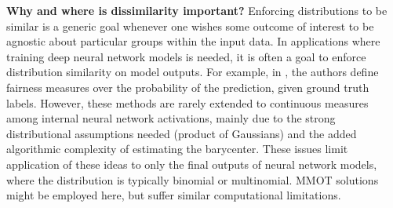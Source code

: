 
\noindent\textbf{Why and where is dissimilarity important?}
Enforcing distributions to be similar is a generic goal whenever one wishes some outcome of interest to be agnostic about particular groups within the input data.
In applications where training deep neural network models is needed,
it is often a goal to enforce distribution similarity on model outputs. 
For example, in \cite{jiang2020wasserstein}, the authors define fairness measures over the probability of the prediction, given ground truth labels.   
% 
However, these methods are rarely extended to continuous measures 
among internal neural network activations,
mainly due to the strong distributional assumptions needed (product of Gaussians) and the added algorithmic complexity of estimating the barycenter.
These issues limit application of these ideas 
to only the final outputs of neural network models, where the distribution is typically binomial or multinomial.
MMOT solutions might be employed here, but suffer similar computational limitations.

